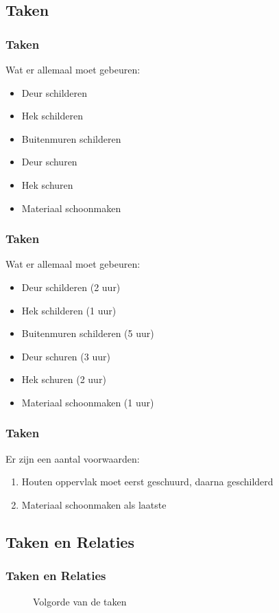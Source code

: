 \documentclass{beamer}
\theoremstyle{definition}
\newcommand{\inputtikz}[1]{}
\begin{document}
\subsection{Taken}
\begin{frame}
    \frametitle{Taken}
    Wat er allemaal moet gebeuren:
     \begin{itemize}
    	\item Deur schilderen
	\item Hek schilderen
	\item Buitenmuren schilderen
	\item<2-> Deur schuren
	\item<2-> Hek schuren
	\item<3-> Materiaal schoonmaken
    \end{itemize}
\end{frame}

\begin{frame}
    \frametitle{Taken}
    Wat er allemaal moet gebeuren:
     \begin{itemize}
    	\item Deur schilderen (2 uur)
	\item Hek schilderen (1 uur)
	\item Buitenmuren schilderen (5 uur)
	\item Deur schuren (3 uur)
	\item Hek schuren (2 uur)
	\item Materiaal schoonmaken (1 uur)
    \end{itemize}
\end{frame}

\begin{frame}
    	\frametitle{Taken}
   	Er zijn een aantal voorwaarden:
	\begin{enumerate}
	    	\item Houten oppervlak moet eerst geschuurd, daarna geschilderd
		\item Materiaal schoonmaken als laatste
	\end{enumerate}
\end{frame}

\subsection{Taken en Relaties}
\begin{frame}
	\frametitle{Taken en Relaties}
	\vspace{-1em}
	\begin{figure}[ht]
		\makebox[\textwidth][c]{\resizebox{.8\paperwidth}{!}{
			\inputtikz{precendence_graph}
		}}
		\vspace{-1em}
		\caption{Volgorde van de taken}
	\end{figure}
\end{frame}
\end{document}
